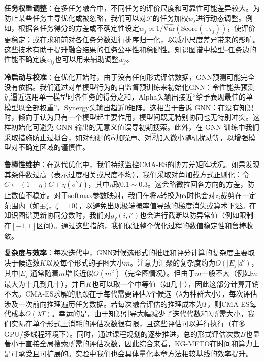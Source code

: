 \documentclass[../main.tex]{subfiles}
\begin{document}
\textbf{任务权重调整}：在多任务融合中，不同任务的评价尺度和可靠性可能差异较大。为防止某些任务主导优化或被忽略，我们可以对$\mathcal{F}$的任务加权$w_j$进行动态调整。例如，根据各任务得分的方差或不确定性设定$w_j \propto 1/\widehat{\mathrm{Var}}(\text{Score}(\cdot,\tau_j))$，使评价更稳定；或在求和前对各任务分数进行排序归一化，以减小尺度差异带来的影响。这些技术有助于提升融合结果的任务公平性和稳健性。知识图谱中模型--任务边的性能不确定度$\upsilon_{ij}$也可以用来辅助调整$w_j$。

\textbf{冷启动与校准}：在优化开始时，由于没有任何形式评估数据，GNN预测可能完全没有依据。我们通过对单模型行为的自监督预训练来初始化GNN：令性能头预测$\hat{y}_f$逼近选用单一模型时各任务的得分之和，Alpha头输出接近“给予表现最佳的单模型以全部权重”，Synergy头输出趋近0矩阵。这相当于告诉 GNN：在没有知识时，倾向于认为只有一个模型起主要作用，模型间既无特别协同也无特别冲突。这样初始化可避免 GNN 输出的无意义值误导初期搜索。此外，在 GNN 训练中我们采取措施防止过拟合，如对预测的$\hat{\boldsymbol{\alpha}}$加噪声、对$\hat{S}$加入微小随机扰动等，以增强模型对不确定区域的谨慎性。

\textbf{鲁棒性维护}：在迭代优化中，我们持续监控CMA-ES的协方差矩阵状况。如果发现其条件数过高（表示过度相关或尺度不均），我们采取对角加载方式正则化：令$C \leftarrow (1-\eta)C + \eta(\sigma^2 I)$，其中$\eta$取$0.1\sim0.3$。这会略微拉回各方向的方差，防止数值不稳定。对于softmax参数映射，我们在将$\mathbf{z}$转换为$\boldsymbol{\alpha}$时也会对$z_i$裁剪在一定范围内（如$\pm \zeta$，$\zeta=10$），以避免出现极端概率值导致的梯度消失或算术下溢。在知识图谱更新协同分数时，我们对$g_f(i,i')$也会进行截断以防异常值（例如限制在$[-1,1]$区间）。通过这些措施，我们保证整个优化过程的数值稳定性和鲁棒收敛。

\textbf{复杂度与效率}：每次迭代中，GNN对候选形式的推理和评分计算的复杂度主要取决于候选数$K$以及每个形式的子图大小$m$。注意力汇聚的复杂度约为$O(|E_f|d')$，其中$|E_f|$通常随着$m$增长近似$O(m^2)$（完全图情况）。但由于$m$一般不大（例如$m$最大为十几到几十），并且$K$也可以取一个中等值（如几十），因此这部分计算开销不大。CMA-ES求解的瓶颈在于每代需要评估$\lambda$个候选（$\lambda$为种群大小），每次评估涉及一次前向推理遍历任务数据。若每次融合评估的推理成本为$T$，则CMA-ES每代成本$O(\lambda T)$。幸运的是，由于知识引导大幅减少了迭代代数和$\lambda$所需大小，我们实际在单个形式上消耗的评估次数很有限，且这些评估可以并行执行（在多GPU/多线程环境下）。同时，通过课程规划的逐步推进，总的形式评估次数$B$也显著小于直接全局搜索所需的评估次数，因此综合来看，KG-MFTO在时间和算力上是可承受且可扩展的。实验中我们也会具体量化本章方法相较基线的效率提升。
\end{document}
